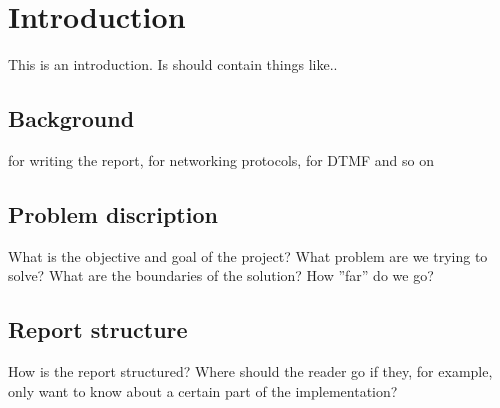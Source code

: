 \chapter{Introduction}
This is an introduction. Is should contain things like..

\section{Background}
for writing the report, for networking protocols, for DTMF and so on

\section{Problem discription}
What is the objective and goal of the project? What problem are we trying to solve? What are the boundaries of the solution? How ''far'' do we go?

\section{Report structure}
How is the report structured? Where should the reader go if they, for example, only want to know about a certain part of the implementation?